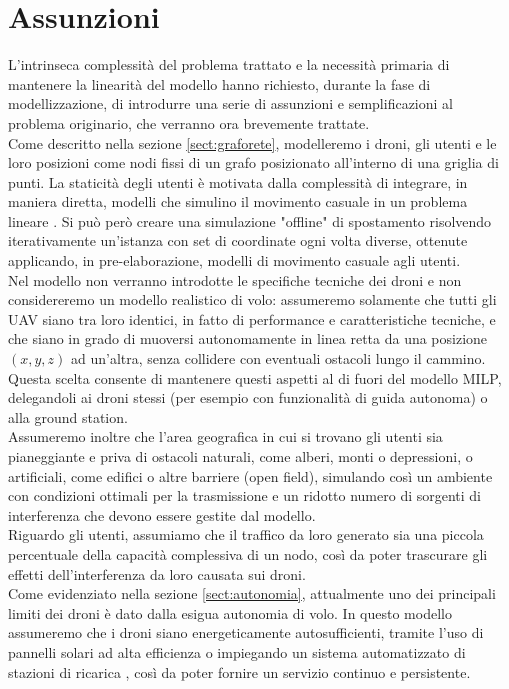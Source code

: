 \section{Assunzioni}
L'intrinseca complessità del problema trattato e la necessità primaria di mantenere la linearità del modello hanno richiesto, durante la fase di modellizzazione, di introdurre una serie di assunzioni e semplificazioni al problema originario, che verranno ora brevemente trattate. \\
Come descritto nella sezione \ref{sect:graforete}, modelleremo i droni, gli utenti e le loro posizioni come nodi fissi di un grafo posizionato all'interno di una griglia di punti. La staticità degli utenti è motivata dalla complessità di integrare, in maniera diretta, modelli che simulino il movimento casuale in un problema lineare \cite{Johnson1996, bai2004survey}. Si può però creare una simulazione "offline" di spostamento risolvendo iterativamente un'istanza con set di coordinate ogni volta diverse, ottenute applicando, in pre-elaborazione, modelli di movimento casuale agli utenti.\\
Nel modello non verranno introdotte le specifiche tecniche dei droni e non considereremo un modello realistico di volo: assumeremo solamente che tutti gli UAV siano tra loro identici, in fatto di performance e caratteristiche tecniche, e che siano in grado di muoversi autonomamente in linea retta da una posizione $(x,y,z)$ ad un'altra, senza collidere con eventuali ostacoli lungo il cammino. Questa scelta consente di mantenere questi aspetti al di fuori del modello MILP, delegandoli ai droni stessi (per esempio con funzionalità di guida autonoma) o alla ground station. \\
Assumeremo inoltre che l'area geografica in cui si trovano gli utenti sia pianeggiante e priva di ostacoli naturali, come alberi, monti o depressioni, o artificiali, come edifici o altre barriere (open field), simulando così un ambiente con condizioni ottimali per la trasmissione e un ridotto numero di sorgenti di interferenza che devono essere gestite dal modello. \\
Riguardo gli utenti, assumiamo che il traffico da loro generato sia una piccola percentuale della capacità complessiva di un nodo, così da poter trascurare gli effetti dell'interferenza da loro causata sui droni. \\
Come evidenziato nella sezione \ref{sect:autonomia}, attualmente uno dei principali limiti dei droni è dato dalla esigua autonomia di volo. 
In questo modello assumeremo che i droni siano energeticamente autosufficienti, tramite l'uso di pannelli solari ad alta efficienza \cite{alta} o impiegando un sistema automatizzato di stazioni di ricarica \cite{Song2014}, così da poter fornire un servizio continuo e persistente. 
